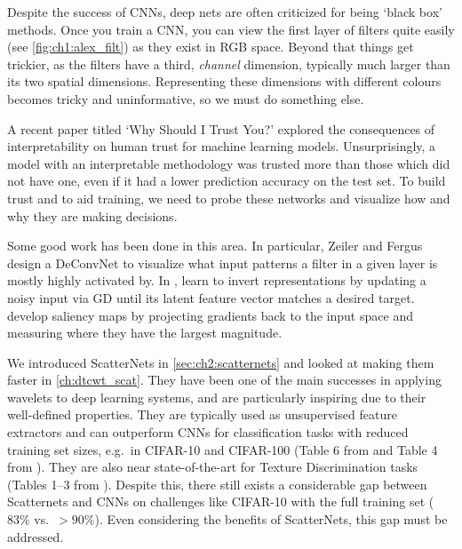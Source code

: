 Despite the success of CNNs, deep nets are often criticized for being `black box'
methods. Once you train a CNN, you can view the first layer of filters
quite easily (see \autoref{fig:ch1:alex_filt}) as they exist in RGB
space. Beyond that things get trickier, as the filters have a third, \emph{channel}
dimension, typically much larger than its two spatial dimensions.
Representing these dimensions with different colours becomes tricky and
uninformative, so we must do something else.

A recent paper titled `Why Should I Trust You?' \cite{ribeiro_why_2016}
explored the consequences of interpretability on human trust for machine learning models.
Unsurprisingly, a model with an interpretable methodology
was trusted more than those which did not have one, even if it had a lower
prediction accuracy on the test set.
To build trust and to aid training, we need to probe these networks and
visualize how and why they are making decisions.

Some good work has been done in this area. In particular,
Zeiler and Fergus \cite{zeiler_visualizing_2014}
design a DeConvNet to visualize what input patterns a filter in a given layer is mostly highly
activated by. In \cite{mahendran_understanding_2015},
\citeauthor{mahendran_understanding_2015} learn to invert
representations by updating a noisy input via GD until its latent feature vector
matches a desired target. \citeauthor{simonyan_deep_2014}
\cite{simonyan_deep_2014} develop saliency maps by projecting gradients back to
the input space and measuring where they have the largest magnitude.

We introduced ScatterNets in \autoref{sec:ch2:scatternets} and looked at making
them faster in \autoref{ch:dtcwt_scat}.
They have been one of the main successes in applying wavelets to deep learning
systems, and are particularly inspiring due to their well-defined properties.
They are typically used as unsupervised feature extractors
\cite{bruna_invariant_2013, oyallon_deep_2015,
singh_dual-tree_2017, singh_multi-resolution_2016} and
can outperform CNNs for classification tasks with reduced
training set sizes, e.g.\ in CIFAR-10 and CIFAR-100 (Table 6 from
\cite{oyallon_scaling_2017} and Table 4 from \cite{singh_dual-tree_2017}).
They are also near state-of-the-art for Texture Discrimination tasks
(Tables 1--3 from \cite{sifre_rotation_2013}). Despite this, there still exists
a considerable gap between Scatternets and CNNs on challenges like CIFAR-10 with the
full training set ($83\%$ vs.\ $>90\%$). Even considering the benefits of
ScatterNets, this gap must be addressed.

